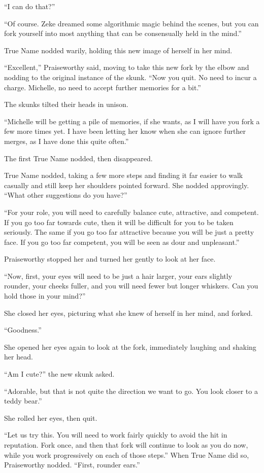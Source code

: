 ``I can do that?''

``Of course. Zeke dreamed some algorithmic magic behind the scenes, but you can fork yourself into most anything that can be consensually held in the mind.''

True Name nodded warily, holding this new image of herself in her mind.

``Excellent,'' Praiseworthy said, moving to take this new fork by the elbow and nodding to the original instance of the skunk. ``Now you quit. No need to incur a charge. Michelle, no need to accept further memories for a bit.''

The skunks tilted their heads in unison.

``Michelle will be getting a pile of memories, if she wants, as I will have you fork a few more times yet. I have been letting her know when she can ignore further merges, as I have done this quite often.''

The first True Name nodded, then disappeared.

True Name nodded, taking a few more steps and finding it far easier to walk casually and still keep her shoulders pointed forward. She nodded approvingly. ``What other suggestions do you have?''

``For your role, you will need to carefully balance cute, attractive, and competent. If you go too far towards cute, then it will be difficult for you to be taken seriously. The same if you go too far attractive because you will be just a pretty face. If you go too far competent, you will be seen as dour and unpleasant.''

Praiseworthy stopped her and turned her gently to look at her face.

``Now, first, your eyes will need to be just a hair larger, your ears slightly rounder, your cheeks fuller, and you will need fewer but longer whiskers. Can you hold those in your mind?''

She closed her eyes, picturing what she knew of herself in her mind, and forked.

``Goodness.''

She opened her eyes again to look at the fork, immediately laughing and shaking her head.

``Am I cute?'' the new skunk asked.

``Adorable, but that is not quite the direction we want to go. You look closer to a teddy bear.''

She rolled her eyes, then quit.

``Let us try this. You will need to work fairly quickly to avoid the hit in reputation. Fork once, and then that fork will continue to look as you do now, while you work progressively on each of those steps.'' When True Name did so, Praiseworthy nodded. ``First, rounder ears.''

